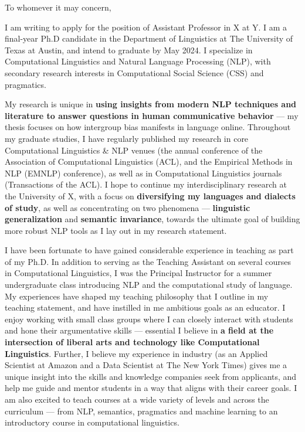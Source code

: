 \documentclass[11pt, letterpaper]{practical-letter}
\begin{document}
\senderbox

\opening{To whomever it may concern,}

I am writing to apply for the position of Assistant Professor in X at Y. I am a final-year Ph.D candidate in the Department of Linguistics at The University of Texas at Austin, and intend to graduate by May 2024. I specialize in Computational Linguistics and Natural Language Processing (NLP), with secondary research interests in Computational Social Science (CSS) and pragmatics.

My research is unique in \textbf{using insights from modern NLP techniques and literature to answer questions in human communicative behavior} --- my thesis focuses on how intergroup bias manifests in language online. Throughout my graduate studies, I have regularly published my research in core Computational Linguistics \& NLP venues (the annual conference of the Association of Computational Linguistics (ACL), and the Empirical Methods in NLP (EMNLP) conference), as well as in Computational Linguistics journals (Transactions of the ACL). I hope to continue my interdisciplinary research at the University of X, with a focus on \textbf{diversifying my languages and dialects of study}, as well as concentrating on two phenomena --- \textbf{linguistic generalization} and \textbf{semantic invariance}, towards the ultimate goal of building more robust NLP tools as I lay out in my research statement. 

I have been fortunate to have gained considerable experience in teaching as part of my Ph.D. In addition to serving as the Teaching Assistant on several courses in Computational Linguistics, I was the Principal Instructor for a summer undergraduate class introducing NLP and the computational study of language. My experiences have shaped my teaching philosophy that I outline in my teaching statement, and have instilled in me ambitious goals as an educator. I enjoy working with small class groups where I can closely interact with students and hone their argumentative skills --- essential I believe in \textbf{a field at the intersection of liberal arts and technology like Computational Linguistics}. Further, I believe my experience in industry (as an Applied Scientist at Amazon and a Data Scientist at The New York Times) gives me a unique insight into the skills and knowledge companies seek from applicants, and help me guide and mentor students in a way that aligns with their career goals. I am also excited to teach courses at a wide variety of levels and across the curriculum --- from NLP, semantics, pragmatics and machine learning to an introductory course in computational linguistics.
\end{document}
